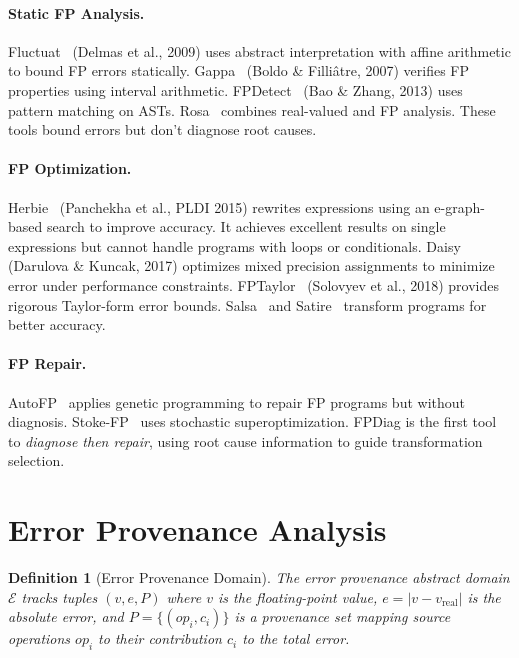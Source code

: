 \documentclass[11pt]{article}
\newtheorem{definition}[theorem]{Definition}
\begin{document}
\paragraph{Static FP Analysis.} Fluctuat~\cite{fluctuat} (Delmas et al., 2009) uses abstract interpretation with affine arithmetic to bound FP errors statically. Gappa~\cite{gappa} (Boldo \& Filli\^{a}tre, 2007) verifies FP properties using interval arithmetic. FPDetect~\cite{fpdetect} (Bao \& Zhang, 2013) uses pattern matching on ASTs. Rosa~\cite{rosa} combines real-valued and FP analysis. These tools bound errors but don't diagnose root causes.

\paragraph{FP Optimization.} Herbie~\cite{herbie} (Panchekha et al., PLDI 2015) rewrites expressions using an e-graph-based search to improve accuracy. It achieves excellent results on single expressions but cannot handle programs with loops or conditionals. Daisy~\cite{daisy} (Darulova \& Kuncak, 2017) optimizes mixed precision assignments to minimize error under performance constraints. FPTaylor~\cite{fptaylor} (Solovyev et al., 2018) provides rigorous Taylor-form error bounds. Salsa~\cite{salsa} and Satire~\cite{satire} transform programs for better accuracy.

\paragraph{FP Repair.} AutoFP~\cite{autofp} applies genetic programming to repair FP programs but without diagnosis. Stoke-FP~\cite{stoke} uses stochastic superoptimization. FPDiag is the first tool to \emph{diagnose then repair}, using root cause information to guide transformation selection.

\section{Error Provenance Analysis}
\label{sec:diagnosis}

\begin{definition}[Error Provenance Domain]
The error provenance abstract domain $\mathcal{E}$ tracks tuples $(v, e, P)$ where $v$ is the floating-point value, $e = |v - v_{\text{real}}|$ is the absolute error, and $P = \{(op_i, c_i)\}$ is a provenance set mapping source operations $op_i$ to their contribution $c_i$ to the total error.
\end{definition}
\end{document}
